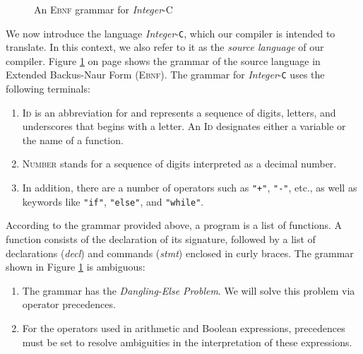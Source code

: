\begin{figure}[!ht]
\begin{center}
\begin{minipage}[t]{12.5cm}
  \end{minipage}
  \end{center}
  \caption{An \textsc{Ebnf} grammar for \textsl{Integer}-\textsc{C}}
\label{fig:compiler.ebnf}
\end{figure}

\noindent
We now introduce the language \textsl{Integer}-\texttt{C}, which our compiler is intended to translate. In this context, we also refer to it as the \emph{source language} of our compiler. Figure \ref{fig:compiler.ebnf} on page \pageref{fig:compiler.ebnf} shows the grammar of the source language in Extended Backus-Naur Form (\textsc{Ebnf}). The grammar for \textsl{Integer}-\texttt{C} uses the following terminals:
\begin{enumerate}
\item \textsc{Id} is an abbreviation for  and represents a sequence of digits, letters, and underscores that begins with a letter. An \textsc{Id} designates either a variable or the name of a function.
\item \textsc{Number} stands for a sequence of digits interpreted as a decimal number.
\item In addition, there are a number of operators such as \texttt{"+"}, \texttt{"-"}, etc., as well as keywords like \texttt{"if"}, \texttt{"else"}, and \texttt{"while"}.
\end{enumerate}
According to the grammar provided above, a program is a list of functions. A function consists of the
declaration of its signature, followed by a list of declarations (\textsl{decl}) and commands (\textsl{stmt})
enclosed in curly braces.
The grammar shown
in Figure \ref{fig:compiler.ebnf} is ambiguous: 
\begin{enumerate}
\item The grammar has the \emph{Dangling-Else Problem}.  We will solve this problem via operator precedences. 
\item For the operators used in arithmetic and Boolean expressions, precedences must be set to resolve
      ambiguities in the interpretation of these expressions. 
\end{enumerate}

